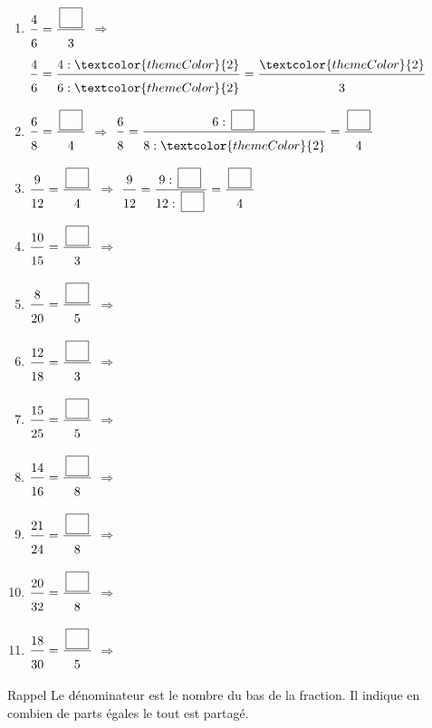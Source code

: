 \begin{enumerate}[leftmargin=*,align=parleft, label=\alph*), itemsep=9pt]
\item $\FA{4}{6}=\FA{\CaseC}{3}$ \quad $\Longrightarrow$ \quad $\FA{4}{6}=\FA{4 : \textcolor{themeColor}{2}}{6 : \textcolor{themeColor}{2}}=\FA{\textcolor{themeColor}{2}}{3}$
\item $\FA{6}{8}=\FA{\CaseC}{4}$ \quad $\Longrightarrow$ \quad $\FA{6}{8}=\FA{6 : \CaseC}{8 : \textcolor{themeColor}{2}}=\FA{\CaseC}{4}$
\item $\FA{9}{12}=\FA{\CaseC}{4}$ \quad $\Longrightarrow$ \quad $\FA{9}{12}=\FA{9 : \CaseC}{12 : \CaseC}=\FA{\CaseC}{4}$
\item $\FA{10}{15}=\FA{\CaseC}{3}$ \quad $\Longrightarrow$
\item $\FA{8}{20}=\FA{\CaseC}{5}$ \quad $\Longrightarrow$
\item $\FA{12}{18}=\FA{\CaseC}{3}$ \quad $\Longrightarrow$
\item $\FA{15}{25}=\FA{\CaseC}{5}$ \quad $\Longrightarrow$
\item $\FA{14}{16}=\FA{\CaseC}{8}$ \quad $\Longrightarrow$
\item $\FA{21}{24}=\FA{\CaseC}{8}$ \quad $\Longrightarrow$
\item $\FA{20}{32}=\FA{\CaseC}{8}$ \quad $\Longrightarrow$
\item $\FA{18}{30}=\FA{\CaseC}{5}$ \quad $\Longrightarrow$
\end{enumerate}
 
\newpage
{}

\begin{astuce}{Rappel}
Le \textcolor{themeColor}{dénominateur} est le nombre du bas de la fraction. Il indique en combien de parts égales le tout est partagé.
\end{astuce}
  
